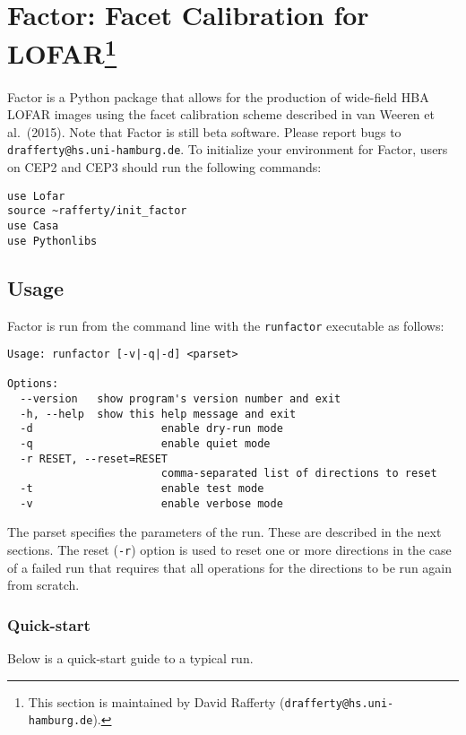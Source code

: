 \documentclass[structabstract]{article}
\begin{document}

\section[Factor: Facet Calibration for LOFAR]{Factor: Facet Calibration for
LOFAR\footnote{This section is maintained by David Rafferty
({\tt drafferty@hs.uni-hamburg.de}).}}
\label{factor}

Factor is a Python package that allows for the production of wide-field HBA
LOFAR images using the facet calibration scheme described in van Weeren et al.\
(2015). Note that Factor is still beta software. Please report bugs to
{\tt drafferty@hs.uni-hamburg.de}. To initialize your environment for Factor,
users on CEP2 and CEP3 should run the following commands:
\begin{verbatim}
use Lofar
source ~rafferty/init_factor
use Casa
use Pythonlibs
\end{verbatim}

\subsection{Usage}
\label{factor:usage}

Factor is run from the command line with the {\tt runfactor} executable as
follows:
\begin{verbatim}
Usage: runfactor [-v|-q|-d] <parset>

Options:
  --version   show program's version number and exit
  -h, --help  show this help message and exit
  -d                    enable dry-run mode
  -q                    enable quiet mode
  -r RESET, --reset=RESET
                        comma-separated list of directions to reset
  -t                    enable test mode
  -v                    enable verbose mode
\end{verbatim}
The parset specifies the parameters of the run. These are described in the next
sections. The reset ({\tt -r}) option is used to reset one or more directions in
the case of a failed run that requires that all operations for the directions
to be run again from scratch.

\subsubsection{Quick-start}
\label{factor:quick-start}
Below is a quick-start guide to a typical run.
\end{document}
